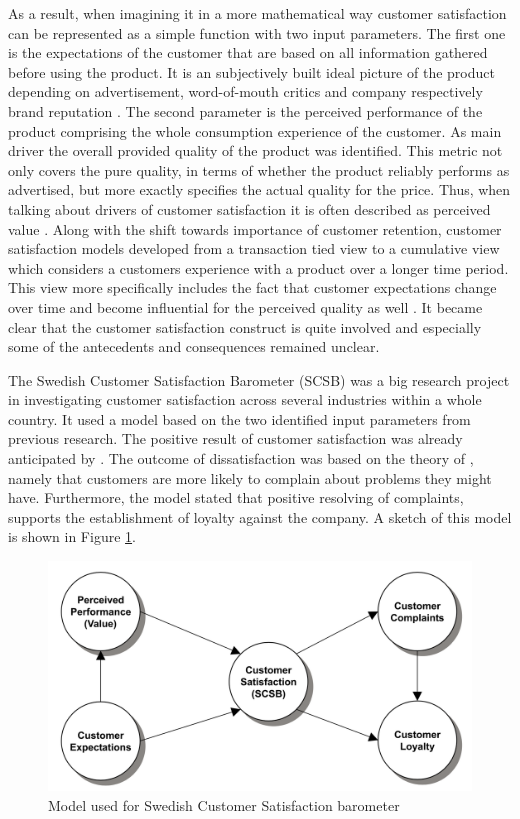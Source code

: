 As a result, when imagining it in a more mathematical way customer satisfaction can be represented as a simple function with two input parameters. The first one is the expectations of the customer that are based on all information gathered before using the product. It is an subjectively built ideal picture of the product depending on advertisement, word-of-mouth critics and company respectively brand reputation \cite{johnson2001evolution} \cite{neckel2015}. The second parameter is the perceived performance of the product comprising the whole consumption experience of the customer. As main driver the overall provided quality of the product was identified. This metric not only covers the pure quality, in terms of whether the product reliably performs as advertised, but more exactly specifies the actual quality for the price. Thus, when talking about drivers of customer satisfaction it is often described as perceived value \cite{johnson2001evolution} \cite{fornell1992national}. Along with the shift towards importance of customer retention, customer satisfaction models developed from a transaction tied view to a cumulative view which considers a customers experience with a product over a longer time period. This view more specifically includes the fact that customer expectations change over time and become influential for the perceived quality as well \cite{johnson1996expectations}. It became clear that the customer satisfaction construct is quite involved and especially some of the antecedents and consequences remained unclear. 

The Swedish Customer Satisfaction Barometer (SCSB) was a big research project in investigating customer satisfaction across several industries within a whole country. It used a model based on the two identified input parameters from previous research. The positive result of customer satisfaction was already anticipated by \cite{bolton1998dynamic} \cite{gustafsson2005effects}. The outcome of dissatisfaction was based on the theory of \cite{hulett1971exit}, namely that customers are more likely to complain about problems they might have. Furthermore, the model stated that positive resolving of complaints, supports the establishment of loyalty against the company. A sketch of this model is shown in Figure \ref{fig:scsb}.

\begin{figure}
	\centering
	\includegraphics[width=1.0\textwidth]{img/scsb.png}
	\caption{Model used for Swedish Customer Satisfaction barometer \cite{fornell1992national}}
	\label{fig:scsb}
\end{figure} 

